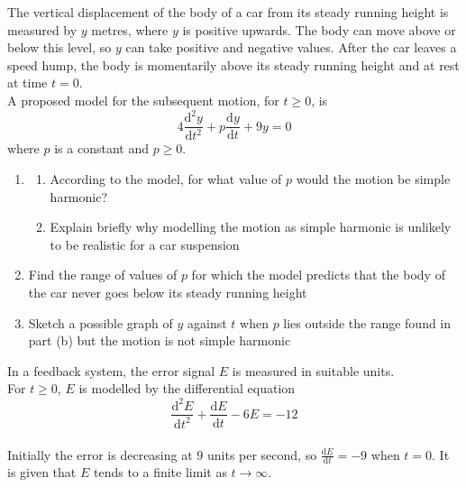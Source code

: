 \documentclass[leqno]{article}
\begin{document}
\djsFrontMatter
\begin{enumerate}[
  label=\textbf{\arabic*.},
  leftmargin=*,
  topsep=0pt,
  partopsep=0pt,
  parsep=0pt
]


\questionitem

The vertical displacement of the body of a car from its steady running height is measured by $y$ metres, where $y$ is positive upwards. The body can move above or below this level, so $y$ can take positive and negative values. After the car leaves a speed hump, the body is momentarily above its steady running height and at rest at time $t=0$. \\

A proposed model for the subsequent motion, for $t\ge 0$, is
\[
4\frac{\mathrm{d}^2 y}{\mathrm{d} t^2}+p\frac{\mathrm{d} y}{\mathrm{d} t}+9y=0
\]
where $p$ is a constant and $p\ge 0$. \\

\begin{enumerate}[label=\textbf{(\alph*)}]
  \item
  \begin{enumerate}[label=(\roman*)]
    \item According to the model, for what value of $p$ would the motion be simple harmonic? 
    \item Explain briefly why modelling the motion as simple harmonic is unlikely to be realistic for a car suspension  \\
  \end{enumerate}
  \item Find the range of values of $p$ for which the model predicts that the body of the car never goes below its steady running height  \\
  \item Sketch a possible graph of $y$ against $t$ when $p$ lies outside the range found in part (b) but the motion is not simple harmonic  \\
\end{enumerate}

\newpage

\questionitem

In a feedback system, the error signal $E$ is measured in suitable units. \\

For $t\ge 0$, $E$ is modelled by the differential equation
\[\frac{\mathrm{d}^2 E}{\mathrm{d} t^2}+\frac{\mathrm{d} E}{\mathrm{d} t}-6E=-12\] \\
Initially the error is decreasing at $9$ units per second, so $\frac{\mathrm{d} E}{\mathrm{d} t}=-9$ when $t=0$. It is given that $E$ tends to a finite limit as $t\to\infty$. \\


\end{enumerate}
\end{document}
